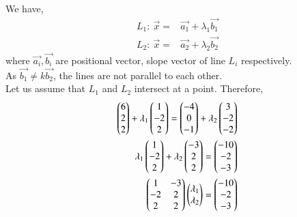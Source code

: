 We have,
\begin{align}
    \label{sep/2/35/eq:3}                       
    L_{1}: \: \Vec{x}={}&\Vec{a_{1}}+\lambda_{1}\Vec{b_{1}}\\
    \label{sep/2/35/eq:4}
    L_{2}: \: \Vec{x}={}&\Vec{a_{2}}+\lambda_{2}\Vec{b_{2}}
\end{align}
where $\Vec{a_{i}},\Vec{b_{i}}$ are positional vector, slope vector of line $L_{i}$ respectively.\\
As $\Vec{b_{1}}\neq k \Vec{b_{2}}$, the lines are not parallel to each other.
\\ Let us assume that $L_{1}$ and $L_{2}$ intersect at a point. Therefore,
\begin{align}
    \label{sep/2/35/eq:5}
    \begin{pmatrix}6 \\ 2\\ 2 \end{pmatrix} +\lambda_{1}\begin{pmatrix}1 \\ -2 \\ 2\end{pmatrix} = \begin{pmatrix}-4 \\ 0\\ -1\end{pmatrix} + \lambda_{2}\begin{pmatrix}3 \\ -2 \\ -2\end{pmatrix} \\
    \label{sep/2/35/eq:6}
    \lambda_{1}\begin{pmatrix}1 \\ -2 \\ 2\end{pmatrix} + \lambda_{2}\begin{pmatrix}-3 \\ 2 \\ 2\end{pmatrix}= \begin{pmatrix}-10 \\ -2\\ -3 \end{pmatrix} \\
    \label{sep/2/35/eq:7}
    \begin{pmatrix}1 & -3\\ -2 &2 \\ 2 & 2\end{pmatrix}\begin{pmatrix}\lambda_{1}\\ \lambda_{2}\end{pmatrix}=
    \begin{pmatrix}-10 \\ -2\\ -3 \end{pmatrix}
\end{align}

